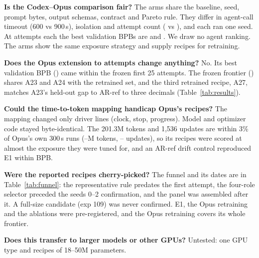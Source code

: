 \documentclass{article}
\begin{document}
\textbf{Is the Codex--Opus comparison fair?} The arms share the baseline, seed, prompt bytes, output schemas, contract and Pareto rule. They differ in agent-call timeout (600 vs 900\,s), isolation and attempt count (\CRCxAttempts{} vs \CROpAttempts), and each ran one seed. At \CRCxAttempts{} attempts each the best validation BPBs are \CRCxBestBPB{} and \CROpBestTwentyTwo. We draw no agent ranking. The arms show the same exposure strategy and supply recipes for retraining.

\textbf{Does the Opus extension to \CROpAttempts{} attempts change anything?} No. Its best validation BPB (\CROpBestFrozen) came within the frozen first 25 attempts. The frozen frontier (\CROpFrontierFrozen) shares A23 and A24 with the retrained set, and the third retrained recipe, A27, matches A23's held-out gap to AR-ref to three decimals (Table~\ref{tab:results}).

\textbf{Could the time-to-token mapping handicap Opus's recipes?} The mapping changed only driver lines (clock, stop, progress). Model and optimizer code stayed byte-identical. The 201.3M tokens and 1{,}536 updates are within 3\% of Opus's own 300\,s runs (\CROpTokLo--\CROpTokHi M tokens, \CROpUpdLo--\CROpUpdHi{} updates), so its recipes were scored at almost the exposure they were tuned for, and an AR-ref drift control reproduced E1 within \CRMTDriftAbs{} BPB.

\textbf{Were the reported recipes cherry-picked?} The funnel and its dates are in Table~\ref{tab:funnel}: the representative rule predates the first attempt, the four-role selector preceded the seeds 0--2 confirmation, and the panel was assembled after it. A full-size candidate (exp 109) was never confirmed. E1, the Opus retraining and the ablations were pre-registered, and the Opus retraining covers its whole frontier.

\textbf{Does this transfer to larger models or other GPUs?} Untested: one GPU type and recipes of 18--50M parameters.
\end{document}
